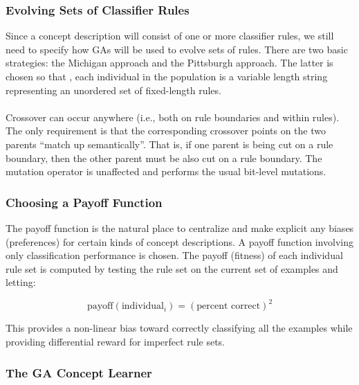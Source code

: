 \documentclass[../main.tex]{subfiles}
\begin{document}
\subsubsection{Evolving Sets of Classifier Rules}
Since a concept description will consist of one or more classifier rules, we still need to specify how GAs will be used
to evolve sets of rules. There are two basic strategies: the Michigan approach and the Pittsburgh approach. The latter
is chosen so that , each individual in the population is a variable length string representing an unordered set of
fixed-length rules.
\\\\
Crossover can occur anywhere (i.e., both on rule boundaries and within rules). The only requirement is that the
corresponding crossover points on the two parents ``match up semantically''. That is, if one parent is being cut on a
rule boundary, then the other parent must be also cut on a rule boundary. The mutation operator is unaffected and
performs the usual bit-level mutations.

\subsubsection{Choosing a Payoff Function}
The payoff function is the natural place to centralize and make explicit any biases (preferences) for certain kinds of
concept descriptions. A payoff function involving only classification performance is chosen. The payoff (fitness) of
each individual rule set is computed by testing the rule set on the current set of examples and letting:

\begin{equation}
	\text{payoff}(\text{individual}_i) = (\text{percent correct})^2
\end{equation}

This provides a non-linear bias toward correctly classifying all the examples while providing differential reward for
imperfect rule sets.

\subsubsection{The GA Concept Learner}
\end{document}
